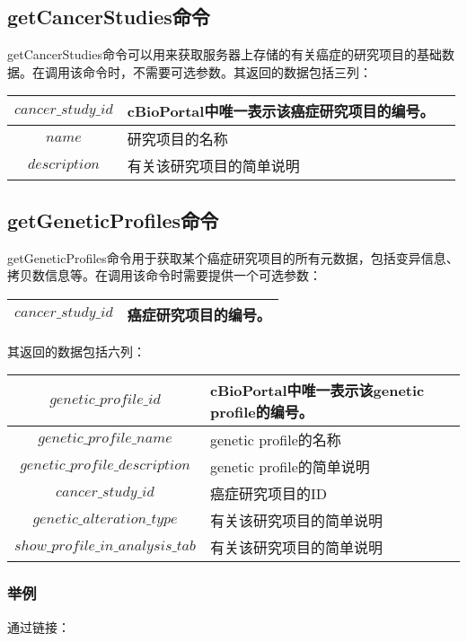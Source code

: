 \subsection{getCancerStudies命令}\label{subsec:getCancerStudies}
getCancerStudies命令可以用来获取服务器上存储的有关癌症的研究项目的基础数据。在调用该命令时，不需要可选参数。其返回的数据包括三列：
\begin{center}
\begin{tabular}{|c|l|l|}
	\hline
	$ cancer\_study\_id $ & cBioPortal中唯一表示该癌症研究项目的编号。\\
	\hline
	$ name $ & 研究项目的名称 \\
	\hline
	$ description $ & 有关该研究项目的简单说明 \\ 
	\hline
\end{tabular}
\end{center}

\subsection{getGeneticProfiles命令}\label{subsec:getGeneticProfiles}
getGeneticProfiles命令用于获取某个癌症研究项目的所有元数据，包括变异信息、拷贝数信息等。在调用该命令时需要提供一个可选参数：
\begin{center}
	\begin{tabular}{|c|l|}
		\hline
		$ cancer\_study\_id $ & 癌症研究项目的编号。\\
		\hline
	\end{tabular}
\end{center}
其返回的数据包括六列：
\begin{center}
\begin{tabular}{|c|l|l|}
	\hline
	$ genetic\_profile\_id $ & cBioPortal中唯一表示该genetic profile的编号。\\
	\hline
	$ genetic\_profile\_name $ & genetic profile的名称 \\
	\hline
	$ genetic\_profile\_description $ & genetic profile的简单说明 \\ 
	\hline
	$ cancer\_study\_id $ & 癌症研究项目的ID \\ 
	\hline
	$ genetic\_alteration\_type $ & 有关该研究项目的简单说明 \\ 
	\hline
	$ show\_profile\_in\_analysis\_tab $ & 有关该研究项目的简单说明 \\ 
	\hline
\end{tabular}
\end{center}
\subsubsection{举例}
通过链接：

